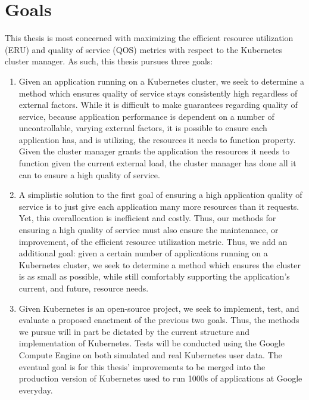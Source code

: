 \documentclass[twoside]{report}
\begin{document}
\section{Goals}

This thesis is most concerned with maximizing the efficient resource utilization
(ERU) and quality of service (QOS) metrics with respect to the Kubernetes cluster manager.
As such, this thesis pursues three goals:

\begin{enumerate}
  \item Given an application running on a Kubernetes cluster, we seek to
    determine a method which ensures quality of
    service stays consistently high regardless of external factors. While it is
    difficult to make guarantees regarding quality of service, because
    application performance is dependent on a number of uncontrollable, varying
    external factors, it is possible to
    ensure each application has, and is utilizing, the resources it needs to
    function property. Given the cluster manager grants the application the
    resources it needs to function given the current external load,
    the cluster manager has done all it can to ensure a high quality of service.
  \item A simplistic solution to the first goal of ensuring a high application
    quality of service is to just give each application many more resources than
    it requests. Yet, this overallocation is inefficient and costly. Thus, our
    methods for ensuring a high quality of service must also ensure the
    maintenance, or improvement, of the efficient resource utilization metric.
    Thus, we add an additional goal: given a certain number of applications
    running on a Kubernetes cluster,
    we seek to determine a method which ensures the cluster is
    as small as possible, while still comfortably
    supporting the application's current, and future, resource needs.
  \item Given Kubernetes is an open-source project, we seek to implement, test, and
    evaluate a proposed enactment of the previous two goals.
    Thus, the methods we pursue will
    in part be dictated by the current structure and implementation of
    Kubernetes. Tests will be conducted using the Google Compute
    Engine\cite{google-compute-engine} on both
    simulated and real Kubernetes user data. The eventual goal is for this
    thesis' improvements to be merged into the production version of Kubernetes
    used to run 1000s of applications at Google everyday.
\end{enumerate}
\end{document}
